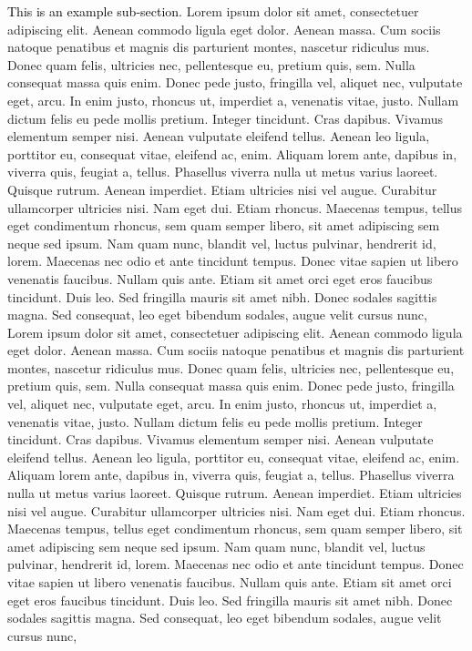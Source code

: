 \documentclass[a4paper]{article}
\begin{document}
\textcolor{black}{This is an example sub-section. }Lorem ipsum dolor sit amet, consectetuer adipiscing elit. Aenean
commodo ligula eget dolor. Aenean massa. Cum sociis natoque penatibus et magnis dis parturient montes, nascetur
ridiculus mus. Donec quam felis, ultricies nec, pellentesque eu, pretium quis, sem. Nulla consequat massa quis enim.
Donec pede justo, fringilla vel, aliquet nec, vulputate eget, arcu. In enim justo, rhoncus ut, imperdiet a, venenatis
vitae, justo. Nullam dictum felis eu pede mollis pretium. Integer tincidunt. Cras dapibus. Vivamus elementum semper
nisi. Aenean vulputate eleifend tellus. Aenean leo ligula, porttitor eu, consequat vitae, eleifend ac, enim. Aliquam
lorem ante, dapibus in, viverra quis, feugiat a, tellus. Phasellus viverra nulla ut metus varius laoreet. Quisque
rutrum. Aenean imperdiet. Etiam ultricies nisi vel augue. Curabitur ullamcorper ultricies nisi. Nam eget dui. Etiam
rhoncus. Maecenas tempus, tellus eget condimentum rhoncus, sem quam semper libero, sit amet adipiscing sem neque sed
ipsum. Nam quam nunc, blandit vel, luctus pulvinar, hendrerit id, lorem. Maecenas nec odio et ante tincidunt tempus.
Donec vitae sapien ut libero venenatis faucibus. Nullam quis ante. Etiam sit amet orci eget eros faucibus tincidunt.
Duis leo. Sed fringilla mauris sit amet nibh. Donec sodales sagittis magna. Sed consequat, leo eget bibendum sodales,
augue velit cursus nunc, Lorem ipsum dolor sit amet, consectetuer adipiscing elit. Aenean commodo ligula eget dolor.
Aenean massa. Cum sociis natoque penatibus et magnis dis parturient montes, nascetur ridiculus mus. Donec quam felis,
ultricies nec, pellentesque eu, pretium quis, sem. Nulla consequat massa quis enim. Donec pede justo, fringilla vel,
aliquet nec, vulputate eget, arcu. In enim justo, rhoncus ut, imperdiet a, venenatis vitae, justo. Nullam dictum felis
eu pede mollis pretium. Integer tincidunt. Cras dapibus. Vivamus elementum semper nisi. Aenean vulputate eleifend
tellus. Aenean leo ligula, porttitor eu, consequat vitae, eleifend ac, enim. Aliquam lorem ante, dapibus in, viverra
quis, feugiat a, tellus. Phasellus viverra nulla ut metus varius laoreet. Quisque rutrum. Aenean imperdiet. Etiam
ultricies nisi vel augue. Curabitur ullamcorper ultricies nisi. Nam eget dui. Etiam rhoncus. Maecenas tempus, tellus
eget condimentum rhoncus, sem quam semper libero, sit amet adipiscing sem neque sed ipsum. Nam quam nunc, blandit vel,
luctus pulvinar, hendrerit id, lorem. Maecenas nec odio et ante tincidunt tempus. Donec vitae sapien ut libero
venenatis faucibus. Nullam quis ante. Etiam sit amet orci eget eros faucibus tincidunt. Duis leo. Sed fringilla mauris
sit amet nibh. Donec sodales sagittis magna. Sed consequat, leo eget bibendum sodales, augue velit cursus nunc,
\end{document}
